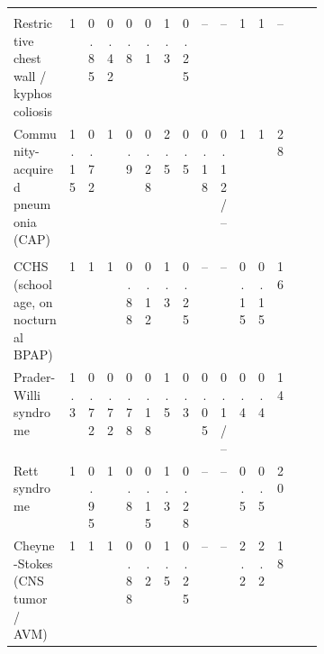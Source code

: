 {\begin{longtable}{@{}>{\raggedright\arraybackslash}p{0.27\linewidth}cccccccccccc>{\raggedright\arraybackslash}p{0.13\linewidth}@{}}
\multicolumn{14}{@{}l}{\textit{Restrictive / parenchymal}}\\
Restrictive chest wall / kyphoscoliosis & 1 & 0.85 & 0.42 & 0.8 & 0.1 & 1.3 & 0.25 & -- & -- & 1 & 1 & -- & \citep{buyse2003}\\
Community-acquired pneumonia (CAP) & 1.15 & 0.72 & 1 & 0.9 & 0.28 & 2.5 & 0.5 & 0.18 & 0.12/-- & 1 & 1 & 28 & \citep{torres2021}\\
\multicolumn{14}{@{}l}{\textit{Central hypoventilation}}\\
CCHS (school age, on nocturnal BPAP) & 1 & 1 & 1 & 0.88 & 0.12 & 1.3 & 0.25 & -- & -- & 0.15 & 0.15 & 16 & \citep{weesemayer2010,trang2005}\\
Prader-Willi syndrome & 1.3 & 0.72 & 0.72 & 0.78 & 0.18 & 1.5 & 0.3 & 0.05 & 0.1/-- & 0.4 & 0.4 & 14 & \citep{hertz1993,gillett2016}\\
Rett syndrome & 1 & 0.95 & 1 & 0.8 & 0.15 & 1.3 & 0.28 & -- & -- & 0.5 & 0.5 & 20 & \citep{julu2001}\\
Cheyne-Stokes (CNS tumor / AVM) & 1 & 1 & 1 & 0.88 & 0.2 & 1.5 & 0.25 & -- & -- & 2.2 & 2.2 & 18 & \citep{bradley2003,naughton1993}\\
\end{longtable}}

